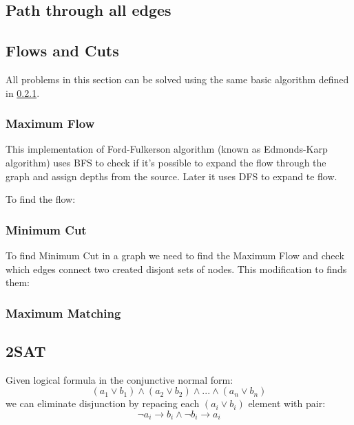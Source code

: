 \documentclass[13pt]{article}
\begin{document}
\subsection{Path through all edges}\label{sub:} %


\subsection{Flows and Cuts}
All problems in this section can be solved using the same basic algorithm defined in \ref{sec:MAXFLOW}.

\subsubsection{Maximum Flow}
\label{sec:MAXFLOW}
This implementation of Ford-Fulkerson algorithm (known as Edmonds-Karp algorithm) uses BFS to check if it's possible to expand the flow through the graph and assign depths from the source. Later it uses DFS to expand te flow.


To find the flow:


\subsubsection{Minimum Cut}
To find Minimum Cut in a graph we need to find the Maximum Flow and check which edges connect two created disjont sets of nodes. This modification to finds them:

\subsubsection{Maximum Matching}

\subsection{2SAT}

Given logical formula in the conjunctive normal form:
\[ (a_1 \vee b_1) \wedge  (a_2 \vee b_2) \wedge ... \wedge (a_{n} \vee b_{n})\]
we can eliminate disjunction by repacing each \( (a_i \vee b_i) \) element with pair:
\[ \neg a_i \rightarrow b_i \wedge \neg b_i \rightarrow a_i \]
\end{document}

